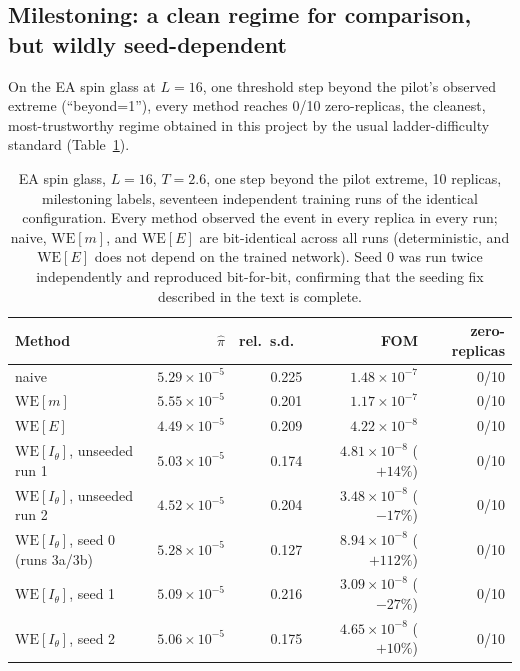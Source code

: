 \documentclass[a4paper,fleqn]{cas-sc}
\let\Oldsubsection\subsection
\renewcommand{\subsection}{\FloatBarrier\Oldsubsection}
\begin{document}
\subsection{Milestoning: a clean regime for comparison, but wildly seed-dependent}\label{sec:milestone}
On the EA spin glass at $L=16$, one threshold step beyond the pilot's observed extreme
(``beyond=1''), every method reaches 0/10 zero-replicas, the cleanest,
most-trustworthy regime obtained in this project by the usual ladder-difficulty standard
(Table~\ref{tab:milestone}).

\begin{table}[H]
\centering\footnotesize
\caption{EA spin glass, $L=16$, $T=2.6$, one step beyond the pilot extreme, 10 replicas,
	milestoning labels, seventeen independent training runs of the identical configuration.
	Every method observed the event in every replica in every run; naive,
	$\mathrm{WE}[m]$, and $\mathrm{WE}[E]$ are bit-identical across all runs (deterministic,
	and $\mathrm{WE}[E]$ does not depend on the trained network). Seed 0 was run twice
	independently and reproduced bit-for-bit, confirming that the seeding fix described in
	the text is complete.}
\label{tab:milestone}
\setlength{\tabcolsep}{4pt}
\begin{tabular}{lrrrr}
	\toprule
	Method & $\hat\pi$ & rel.\ s.d.\ & FOM & zero-replicas \\
	\midrule
	naive & $5.29\times10^{-5}$ & 0.225 & $1.48\times10^{-7}$ & 0/10 \\
	$\mathrm{WE}[m]$ & $5.55\times10^{-5}$ & 0.201 & $1.17\times10^{-7}$ & 0/10 \\
	$\mathrm{WE}[E]$ & $4.49\times10^{-5}$ & 0.209 & $4.22\times10^{-8}$ & 0/10 \\
	$\mathrm{WE}[I_\theta]$, unseeded run 1 & $5.03\times10^{-5}$ & 0.174 &
	$4.81\times10^{-8}$ ($+14\%$) & 0/10 \\
	$\mathrm{WE}[I_\theta]$, unseeded run 2 & $4.52\times10^{-5}$ & 0.204 &
	$3.48\times10^{-8}$ ($-17\%$) & 0/10 \\
	$\mathrm{WE}[I_\theta]$, seed 0 (runs 3a/3b) & $5.28\times10^{-5}$ & 0.127 &
	$8.94\times10^{-8}$ ($+112\%$) & 0/10 \\
	$\mathrm{WE}[I_\theta]$, seed 1 & $5.09\times10^{-5}$ & 0.216 &
	$3.09\times10^{-8}$ ($-27\%$) & 0/10 \\
	$\mathrm{WE}[I_\theta]$, seed 2 & $5.06\times10^{-5}$ & 0.175 &
	$4.65\times10^{-8}$ ($+10\%$) & 0/10 \\

\end{tabular}
\end{table}
\end{document}
